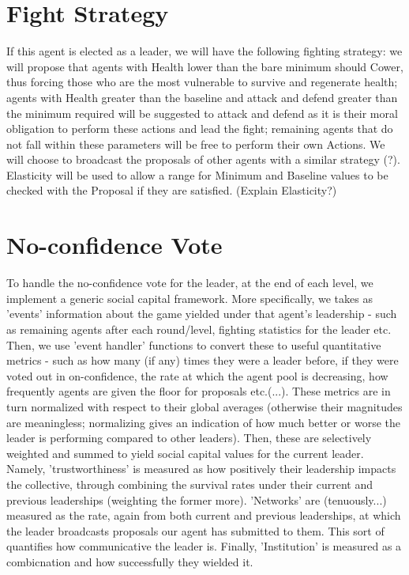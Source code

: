 \section{Fight Strategy} 

If this agent is elected as a leader, we will have the following fighting strategy: we will propose that agents with Health lower than the bare minimum should Cower, thus forcing those who are the most vulnerable to survive and regenerate health; agents with Health greater than the baseline and attack and defend greater than the minimum required will be suggested to attack and defend as it is their moral obligation to perform these actions and lead the fight; remaining agents that do not fall within these parameters will be free to perform their own Actions. We will choose to broadcast the proposals of other agents with a similar strategy (?). Elasticity will be used to allow a range for Minimum and Baseline values to be checked with the Proposal if they are satisfied. (Explain Elasticity?)

\section{No-confidence Vote}

To handle the no-confidence vote for the leader, at the end of each level, we implement a generic social capital framework. More specifically, we takes as 'events' information about the game yielded under that agent's leadership - such as remaining agents after each round/level, fighting statistics for the leader etc. Then, we use 'event handler' functions to convert these to useful quantitative metrics - such as how many (if any) times they were a leader before, if they were voted out in on-confidence, the rate at which the agent pool is decreasing, how frequently agents are given the floor for proposals etc.(...). These metrics are in turn normalized with respect to their global averages (otherwise their magnitudes are meaningless; normalizing gives an indication of how much better or worse the leader is performing compared to other leaders). Then, these are selectively weighted and summed to yield social capital values for the current leader. Namely, 'trustworthiness' is measured as how positively their leadership impacts the collective, through combining the survival rates under their current and previous leaderships (weighting the former more). 'Networks' are (tenuously...) measured as the rate, again from both current and previous leaderships, at which the leader broadcasts proposals our agent has submitted to them. This sort of quantifies how communicative the leader is. Finally, 'Institution' is measured as a combicnation and how successfully they wielded it.


